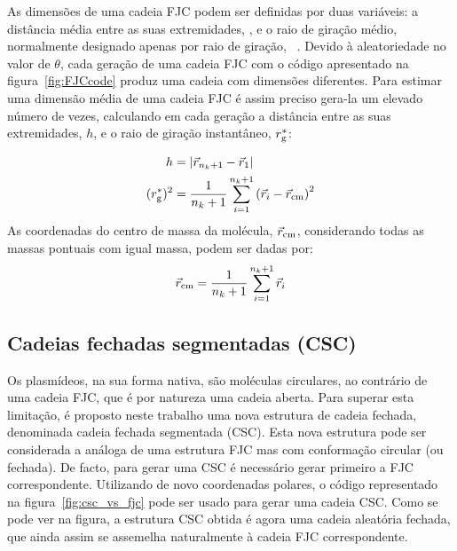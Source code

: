 As dimensões de uma cadeia FJC podem ser definidas por duas variáveis: a distância média entre as suas extremidades, \distanciah, e o raio de giração médio, normalmente designado apenas por raio de giração, \raiogiracao\ \cite{teraoka}. 
Devido à aleatoriedade no valor de $\theta$, cada geração de uma cadeia FJC com o código apresentado na figura~\ref{fig:FJCcode} produz uma cadeia com dimensões diferentes. Para estimar uma dimensão média de uma cadeia FJC é assim preciso gera-la um elevado número de vezes, calculando em cada geração a distância entre as suas extremidades, $h$, e o raio de giração instantâneo, $r_{\mathrm{g}}^{*}$:

\begin{equation}
\label{eq:herg}
\begin{split}
  h & = \left|\vec{r}_{n_{k}+1}-\vec{r}_{1}\right|  \\
  (r_{\mathrm{g}}^{*})^{2} & = \frac{1}{n_{k}+1}\sum_{i=1}^{n_{k}+1}\left(\vec{r}_{i}-\vec{r}_{\mathrm{cm}}\right)^{2}
\end{split}
\end{equation}
As coordenadas do centro de massa da molécula, $\vec{r}_{\mathrm{cm}}$, considerando todas as massas pontuais com igual massa, podem ser dadas por:
\begin{equation}
\label{eq:centromassa}
\vec{r}_{\mathrm{cm}}=\frac{1}{n_{k}+1}\sum_{i=1}^{n_{k}+1} \vec{r}_{i}
\end{equation}

\subsection{Cadeias fechadas segmentadas (CSC)}
\label{subsec:csc}
Os plasmídeos, na sua forma nativa, são moléculas circulares, ao contrário de uma cadeia FJC, que é por natureza uma cadeia aberta. Para superar esta limitação, é proposto neste trabalho uma nova estrutura de cadeia fechada, denominada cadeia fechada segmentada (CSC). Esta nova estrutura pode ser considerada a análoga de uma estrutura FJC mas com conformação circular (ou fechada). De facto, para gerar uma CSC é necessário gerar primeiro a FJC correspondente. Utilizando de novo coordenadas polares, o código representado na figura~\ref{fig:csc_vs_fjc} pode ser usado para gerar uma cadeia CSC. 
Como se pode ver na figura, a estrutura CSC obtida é agora uma cadeia aleatória fechada, que ainda assim se assemelha naturalmente à cadeia FJC correspondente.

